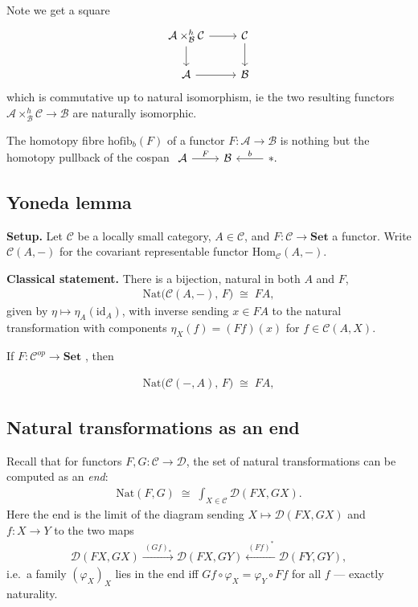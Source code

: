 \documentclass[11pt]{article}
\newcommand{\cat}[1]{\mathcal{#1}}
\theoremstyle{definition}
\begin{document}
Note we get a square
$$
\begin{tikzcd}
    \mathcal{A} \times^h_{\mathcal{B}} \mathcal{C} \rar \dar & \cat{C} \dar \\
    \cat{A} \rar & \cat{B}
\end{tikzcd}
$$
which is commutative up to natural isomorphism, ie the two resulting functors $ \mathcal{A} \times^h_{\mathcal{B}} \mathcal{C} \to \cat{B}$ are naturally isomorphic.


The homotopy fibre $\mathrm{hofib}_b(F)$  of a functor $F: \cat{A}\to \cat{B}$ is nothing but the homotopy pullback of the cospan $\begin{tikzcd}
    \cat{A} \rar{F} & \cat{B} & * \lar[swap]{b}.
\end{tikzcd}$




\subsection{Yoneda lemma}

\textbf{Setup.} Let $\mathcal{C}$ be a locally small category, $A \in \mathcal{C}$, and
$F : \mathcal{C} \to \mathbf{Set}$ a functor. Write $\mathcal{C}(A,-)$ for the covariant
representable functor $\mathrm{Hom}_{\mathcal{C}}(A,-)$.

\bigskip
\textbf{Classical statement.} There is a bijection, natural in both $A$ and $F$,
\begin{align}
\mathrm{Nat}\big(\mathcal{C}(A,-),\, F\big) \;\cong\; FA,
\end{align}
given by $\eta \mapsto \eta_A(\mathrm{id}_A)$, with inverse sending $x \in FA$ to the
natural transformation with components $\eta_X(f) = (Ff)(x)$ for $f \in \mathcal{C}(A,X)$.


If $F : \mathcal{C}^{op} \to \mathbf{Set}$ , then

\begin{align}
\mathrm{Nat}\big(\mathcal{C}(-,A),\, F\big) \;\cong\; FA,
\end{align}
\subsection*{Natural transformations as an end}

Recall that for functors $F,G : \mathcal{C} \to \mathcal{D}$, the set of natural
transformations can be computed as an \emph{end}:
\begin{align}
\mathrm{Nat}(F,G) \;\cong\; \int_{X \in \mathcal{C}} \mathcal{D}(FX, GX).
\end{align}
Here the end is the limit of the diagram sending $X \mapsto \mathcal{D}(FX,GX)$ and
$f : X \to Y$ to the two maps
\begin{align}
\mathcal{D}(FX,GX) \xrightarrow{\ (Gf)_* \ } \mathcal{D}(FX,GY) \xleftarrow{\ (Ff)^* \ } \mathcal{D}(FY,GY),
\end{align}
i.e.\ a family $(\varphi_X)_{X}$ lies in the end iff $Gf \circ \varphi_X = \varphi_Y \circ Ff$
for all $f$ --- exactly naturality.
\end{document}
